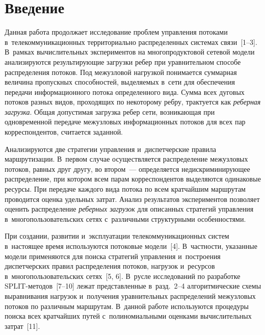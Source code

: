 
  



\thispagestyle{headings}

\begin{multicols}{2}

\label{st\stat}

\section{Введение}

Данная работа продолжает исследование проб\-лем управ\-ле\-ния потоками 
в~телекоммуникационных территориально рас\-пре\-де\-лен\-ных сис\-те\-мах \mbox{связи}~[1--3]. 
В~рамках вы\-чис\-ли\-тель\-ных экспериментов на многопродуктовой сетевой модели 
анализируются ре\-зуль\-ти\-ру\-ющие за\-груз\-ки ребер при урав\-ни\-тель\-ном способе 
распределения потоков. Под межузловой на\-груз\-кой понимается суммарная \mbox{величина} 
про\-пуск\-ных способностей, вы\-де\-ля\-емых в~сети
для обеспечения передачи информационного потока определенного вида. Сумма всех 
дуговых потоков раз\-ных видов, проходящих по некоторому реб\-ру, трактуется как 
\textit{реберная загрузка}. Общая до\-пус\-ти\-мая за\-груз\-ка ребер сети, воз\-ни\-ка\-ющая при 
одновременной передаче межузловых информационных потоков для всех пар 
корреспондентов, считается заданной.

Анализируются две стратегии управ\-ле\-ния и~диспетчерские правила марш\-ру\-ти\-за\-ции. 
В~первом \mbox{случае} осуществляется распределение межузловых потоков, рав\-ных друг 
другу,  во втором~--- определяется не\-диск\-ри\-ми\-ни\-ру\-ющее распределение, при котором  
всем  парам корреспондентов  выделяются одинаковые ресурсы. При передаче каж\-до\-го 
вида потока по всем крат\-чай\-шим марш\-ру\-там проводится оценка удельных за\-трат. 
Анализ результатов экспериментов поз\-во\-ля\-ет оценить распределение \textit{реберных 
загрузок} для описанных стратегий управ\-ле\-ния в~многопользовательских сетях с~различными структурными особенностями.

При создании, развитии и~эксплуатации те\-ле\-ком\-му\-ни\-ка\-ци\-он\-ных сис\-тем
в~на\-сто\-ящее время используются потоковые модели~[4]. В~част\-ности, указанные 
модели применяются для поиска стратегий управ\-ле\-ния и~по\-стро\-ения диспетчерских 
правил рас\-пре\-де\-ле\-ния потоков, на\-гру\-зок и~ресурсов в~многопользовательских сетях~[5, 6]. 
В~русле исследований по разработке SPLIT-ме\-то\-дов~[7--10] лежат 
пред\-став\-лен\-ные в~разд.~2--4 ал\-го\-рит\-ми\-че\-ские схемы вы\-рав\-ни\-ва\-ния нагрузок 
и~получения урав\-ни\-тель\-ных распределений межузловых потоков по раз\-лич\-ным марш\-ру\-там. 
В~данной работе используются процедуры поиска всех крат\-чай\-ших путей 
с~полиномиальными оцен\-ка\-ми вы\-чис\-ли\-тель\-ных за\-трат~[11]. 


\end{multicols}
